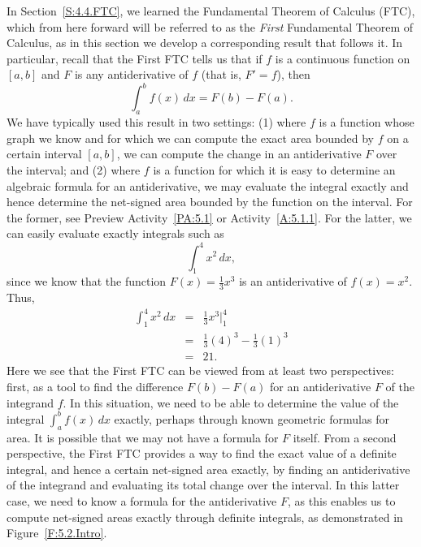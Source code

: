 In Section~\ref{S:4.4.FTC}, we learned the Fundamental Theorem of Calculus (FTC), which from here forward will be referred to as the \emph{First} Fundamental Theorem of Calculus, as in this section we develop a corresponding result that follows it.  In particular, recall that the First FTC tells us that if $f$ is a continuous function on $[a,b]$ and $F$ is any antiderivative of $f$ (that is, $F' = f$), then
$$\int_a^b f(x) \, dx = F(b) - F(a).$$
We have typically used this result in two settings:  (1) where $f$ is a function whose graph we know and for which we can compute the exact area bounded by $f$ on a certain interval $[a,b]$, we can compute the change in an antiderivative $F$ over the interval; and (2) where $f$ is a function for which it is easy to determine an algebraic formula for an antiderivative, we may evaluate the integral exactly and hence determine the net-signed area bounded by the function on the interval.   For the former, see Preview Activity~\ref{PA:5.1} or Activity~\ref{A:5.1.1}.  For the latter, we can easily evaluate exactly integrals such as
$$\int_1^4 x^2 \, dx,$$
since we know that the function $F(x) = \frac{1}{3}x^3$ is an antiderivative of $f(x) = x^2$.  Thus,
\begin{eqnarray*}
\int_1^4 x^2 \, dx & = & \frac{1}{3}x^3 \bigg\vert_1^4 \\
			& = & \frac{1}{3}(4)^3 - \frac{1}{3}(1)^3 \\
			& = & 21.
\end{eqnarray*}
Here we see that the First FTC can be viewed from at least two perspectives:  first, as a tool to find the difference $F(b) - F(a)$ for an antiderivative $F$ of the integrand $f$.  In this situation, we need to be able to determine the value of the integral $\int_a^b f(x) \, dx$ exactly, perhaps through known geometric formulas for area.  It is possible that we may not have a formula for $F$ itself.  From a second perspective, the First FTC provides a way to find the exact value of a definite integral, and hence a certain net-signed area exactly, by finding an antiderivative of the integrand and evaluating its total change over the interval.  In this latter case, we need to know a formula for the antiderivative $F$, as this enables us to compute net-signed areas exactly through definite integrals, as demonstrated in Figure~\ref{F:5.2.Intro}.  

